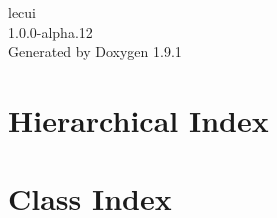 \let\mypdfximage\pdfximage\def\pdfximage{\immediate\mypdfximage}\documentclass[twoside]{book}
\newcommand{\+}{\discretionary{\mbox{\scriptsize$\hookleftarrow$}}{}{}}
\newcommand{\clearemptydoublepage}{%
  \newpage{\pagestyle{empty}\cleardoublepage}%
}
\begin{document}
\raggedbottom

\hypersetup{pageanchor=false,
             bookmarksnumbered=true,
             pdfencoding=unicode
            }
\begin{titlepage}
\vspace*{7cm}
\begin{center}%
{\Large lecui \\[1ex]\large 1.\+0.\+0-\/alpha.\+12 }\\
\vspace*{1cm}
{\large Generated by Doxygen 1.9.1}\\
\end{center}
\end{titlepage}
\clearemptydoublepage
{}
\tableofcontents
\clearemptydoublepage
{}
\hypersetup{pageanchor=true}

\chapter{Hierarchical Index}

\chapter{Class Index}

\end{document}
